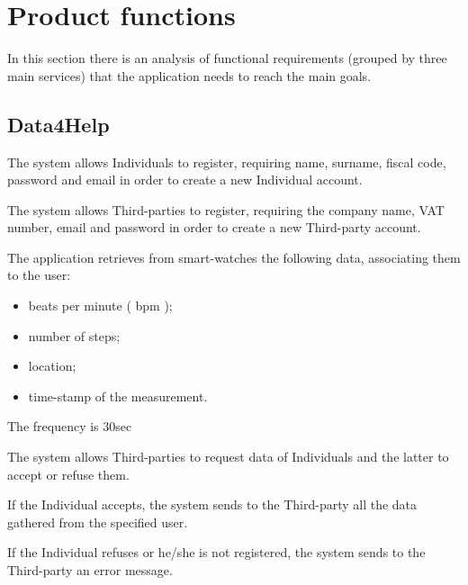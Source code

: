 \section{Product functions}

In this section there is an analysis of functional requirements (grouped by three main services) that the application needs to reach the main goals. 



\subsection{Data4Help}
\begin{enumerate}[label={[}R1.\arabic*{]}, leftmargin=*]

    \item The system allows Individuals to register, requiring name, surname, fiscal code, password and email in order to create a new Individual account.

    \item The system allows Third-parties to register, requiring the company name, VAT number, email and password in order to create a new Third-party account.
    
    \item The application retrieves from smart-watches the following data, associating them to the user: 
    \begin{itemize}
        \item beats per minute ( bpm );
        \item number of steps;
        \item location;
        \item time-stamp of the measurement.
    \end{itemize}
    
    \item The frequency is 30sec %
    
    \item The system allows Third-parties to request data of Individuals and the latter to accept or refuse them. 
    \begin{enumerate}[label={[}R1.\arabic{enumi}.\arabic*{]}, leftmargin=*]
        \item If the Individual accepts, the system sends to the Third-party all the data gathered from the specified user.
    
        \item If the Individual refuses or he/she is not registered, the system sends to the Third-party an error message.
    \end{enumerate}
    

\end{enumerate}
